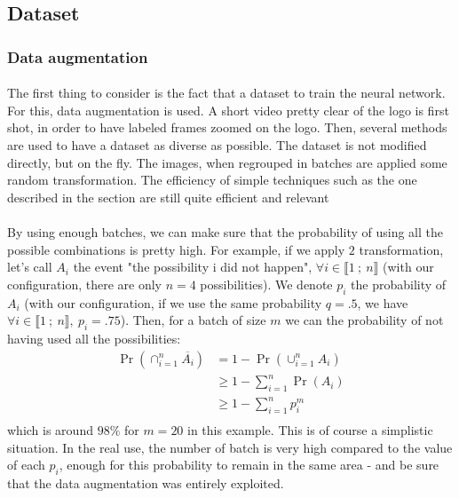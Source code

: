 \documentclass[12pt]{article}%
\begin{document}
\subsection{Dataset}

\subsubsection{Data augmentation}

\paragraph{}
The first thing to consider is the fact that a dataset to train the neural network. For this, data augmentation is used. A short video pretty clear of the logo is first shot, in order to have labeled frames zoomed on the logo. Then, several methods are used to have a dataset as diverse as possible. The dataset is not modified directly, but on the fly. The images, when regrouped in batches are applied some random transformation. The efficiency of simple techniques such as the one described in the section are still quite efficient and relevant \cite{dataAugmentation} 

\paragraph{}
By using enough batches, we can make sure that the probability of using all the possible combinations is pretty high. For example, if we apply $2$ transformation, let's call $A_i$ the event "the possibility i did not happen", $\forall i \in \llbracket 1~;~ n \rrbracket$ (with our configuration, there are only $n = 4$ possibilities). We denote $p_i$ the probability of $A_i$ (with our configuration, if we use the same probability $q = .5$, we have $\forall i \in \llbracket 1~;~ n \rrbracket, \ p_i = .75$). Then, for a batch of size $m$ we can the probability of not having used all the possibilities:
\begin{align*}
\Pr(\cap_{i=1}^{n} \overline{A_i}) &= 1 - \Pr(\cup_{i=1}^{n} A_{i})\\
&\geq 1 - \sum_{i=1}^{n} \Pr(A_i) \\
&\geq 1 - \sum_{i=1}^{n} p_i^{m} \\
\end{align*}
which is around $98\%$ for $m=20$ in this example. This is of course a simplistic situation. In the real use, the number of batch is very high compared to the value of each $p_i$, enough for this probability to remain in the same area - and be sure that the data augmentation was entirely exploited.
\end{document}
